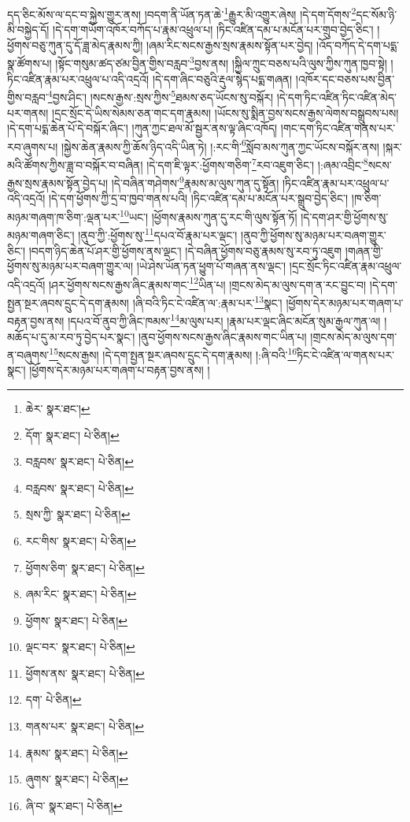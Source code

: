 དད་ཅིང་མོས་ལ་དང་བ་སྐྱེས་གྱུར་ནས། །བདག་ནི་ཡོན་ཏན་ཆེ་\footnote{ཆེར་  སྣར་ཐང་། }རྒྱུར་མི་འགྱུར་ཞེས། །དེ་དག་དོགས་\footnote{དོག་  སྣར་ཐང་།  པེ་ཅིན། }དང་སོམ་ཉི་མི་བསྐྱེད་དོ། །དེ་དག་གཡོག་འཁོར་བཀོད་པ་རྣམ་འཕྲུལ་པ། །ཏིང་འཛིན་དམ་པ་མངོན་པར་གྲུབ་བྱེད་ཅིང་། །ཕྱོགས་བཅུ་ཀུན་དུ་དོ་ཟླ་མེད་རྣམས་ཀྱི། །ཞམ་རིང་སངས་རྒྱས་སྲས་རྣམས་སྟོན་པར་བྱེད། །འོད་བཀོད་དེ་དག་པདྨ་སྣ་ཚོགས་པ། །སྟོང་གསུམ་ཚད་ཙམ་བྱིན་གྱིས་བརླབ་\footnote{བརླབས་  སྣར་ཐང་།  པེ་ཅིན། }བྱས་ནས། །སྐྱིལ་ཀྲུང་བཅས་པའི་ལུས་ཀྱིས་ཀུན་ཁྱབ་སྟེ། །ཏིང་འཛིན་རྣམ་པར་འཕྲུལ་པ་འདི་འདྲའོ། །དེ་དག་ཞིང་བཅུའི་རྡུལ་སྙེད་པདྨ་གཞན། །འཁོར་དང་བཅས་པས་བྱིན་གྱིས་བརླབ་\footnote{བརླབས་  སྣར་ཐང་།  པེ་ཅིན། }བྱས་ཤིང་། །སངས་རྒྱས་:སྲས་ཀྱིས་\footnote{སྲས་ཀྱི་  སྣར་ཐང་།  པེ་ཅིན། }ཐམས་ཅད་ཡོངས་སུ་བསྐོར། །དེ་དག་ཏིང་འཛིན་ཏིང་འཛིན་མེད་པར་གནས། །དྲང་སྲོང་དེ་ཡིས་སེམས་ཅན་གང་དག་རྣམས། །ཡོངས་སུ་སྨིན་བྱས་སངས་རྒྱས་ལེགས་བསྒྲུབས་པས། །དེ་དག་པདྨ་ཆེན་པོ་དེ་བསྐོར་ཞིང་། །ཀུན་ཀྱང་ཐལ་མོ་སྦྱར་ནས་ལྟ་ཞིང་འཁོད། །གང་དག་ཏིང་འཛིན་གནས་པར་རབ་ཞུགས་པ། །སྐྱེས་ཆེན་རྣམས་ཀྱི་ཆོས་ཉིད་འདི་ཡིན་ཏེ། །:རང་གི་\footnote{རང་གིས་  སྣར་ཐང་།  པེ་ཅིན། }སློབ་མས་ཀུན་ཀྱང་ཡོངས་བསྐོར་ནས། །སྐར་མའི་ཚོགས་ཀྱིས་ཟླ་བ་བསྐོར་བ་བཞིན། །དེ་དག་ཇི་ལྟར་:ཕྱོགས་གཅིག་\footnote{ཕྱོགས་ཅིག་  སྣར་ཐང་།  པེ་ཅིན། }རབ་འཇུག་ཅིང་། །:ཞམ་འབྲིང་\footnote{ཞམ་རིང་  སྣར་ཐང་།  པེ་ཅིན། }སངས་རྒྱས་སྲས་རྣམས་སྟོན་བྱེད་པ། །དེ་བཞིན་གཤེགས་\footnote{ཕྱོགས་  སྣར་ཐང་།  པེ་ཅིན། }རྣམས་མ་ལུས་ཀུན་དུ་སྟོན། །ཏིང་འཛིན་རྣམ་པར་འཕྲུལ་པ་འདི་འདྲའོ། །དེ་དག་ཕྱོགས་ཀྱི་དྲ་བ་ཁྱབ་གནས་པའི། །ཏིང་འཛིན་དམ་པ་མངོན་པར་སྒྲུབ་བྱེད་ཅིང་། །ཁ་ཅིག་མཉམ་གཞག་ཁ་ཅིག་:ལྡན་པར་\footnote{ལྡང་བར་  སྣར་ཐང་།  པེ་ཅིན། }ཡང་། །ཕྱོགས་རྣམས་ཀུན་དུ་རང་གི་ལུས་སྟོན་ཏོ། །དེ་དག་ཤར་གྱི་ཕྱོགས་སུ་མཉམ་གཞག་ཅིང་། །ནུབ་ཀྱི་:ཕྱོགས་སུ་\footnote{ཕྱོགས་ནས་  སྣར་ཐང་།  པེ་ཅིན། }དཔའ་བོ་རྣམ་པར་ལྡང་། །ནུབ་ཀྱི་ཕྱོགས་སུ་མཉམ་པར་བཞག་གྱུར་ཅིང་། །བདག་ཉིད་ཆེན་པོ་ཤར་གྱི་ཕྱོགས་ནས་ལྡང་། །དེ་བཞིན་ཕྱོགས་བཅུ་རྣམས་སུ་རབ་ཏུ་འཇུག །གཞན་གྱི་ཕྱོགས་སུ་མཉམ་པར་བཞག་གྱུར་ལ། །ཡེ་ཤེས་ཡོན་ཏན་ཕྱུག་པོ་གཞན་ནས་ལྡང་། །དྲང་སྲོང་ཏིང་འཛིན་རྣམ་འཕྲུལ་འདི་འདྲའོ། །ཤར་ཕྱོགས་སངས་རྒྱས་ཞིང་རྣམས་གང་\footnote{དག་  པེ་ཅིན། }ཡིན་པ། །གྲངས་མེད་མ་ལུས་དག་ན་རང་བྱུང་བ། །དེ་དག་སྤྱན་སྔར་ཞབས་དྲུང་དེ་དག་རྣམས། །ཞི་བའི་ཏིང་ངེ་འཛིན་ལ་:རྣམ་པར་\footnote{གནས་པར་  སྣར་ཐང་།  པེ་ཅིན། }སྣང་། །ཕྱོགས་དེར་མཉམ་པར་གཞག་པ་བརྟན་བྱས་ནས། །དཔའ་བོ་ནུབ་ཀྱི་ཞིང་ཁམས་\footnote{རྣམས་  སྣར་ཐང་།  པེ་ཅིན། }མ་ལུས་པར། །རྣམ་པར་ལྡང་ཞིང་མངོན་སུམ་རྒྱལ་ཀུན་ལ། །མཆོད་པ་དུ་མ་རབ་ཏུ་བྱེད་པར་སྣང་། །ནུབ་ཕྱོགས་སངས་རྒྱས་ཞིང་རྣམས་གང་ཡིན་པ། །གྲངས་མེད་མ་ལུས་དག་ན་བཞུགས་\footnote{ཞུགས་  སྣར་ཐང་།  པེ་ཅིན། }སངས་རྒྱས། །དེ་དག་སྤྱན་སྔར་ཞབས་དྲུང་དེ་དག་རྣམས། །:ཞི་བའི་\footnote{ཞི་བ་  སྣར་ཐང་།  པེ་ཅིན། }ཏིང་ངེ་འཛིན་ལ་གནས་པར་སྣང་། །ཕྱོགས་དེར་མཉམ་པར་གཞག་པ་བརྟན་བྱས་ནས། །
